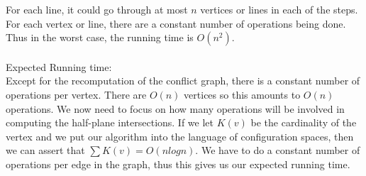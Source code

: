 \documentclass[11pt,psfig]{article}
\begin{document}
For each line, it could go through at most $n$ vertices or lines in each of the steps. \\
For each vertex or line, there are a constant number of operations being done. \\
Thus in the worst case, the running time is $O(n^2)$. \\
\\
Expected Running time:\\
Except for the recomputation of the conflict graph, there is a constant number of operations per vertex. There are $O(n)$ vertices so this amounts to $O(n)$ operations. We now need to focus on how many operations will be involved in computing the half-plane intersections. If we let $K(v)$ be the cardinality of the vertex and we put our algorithm into the language of configuration spaces, then we can assert that $\sum{K(v)} = O(n log n)$. We have to do a constant number of operations per edge in the graph, thus this gives us our expected running time. 
\end{document}
